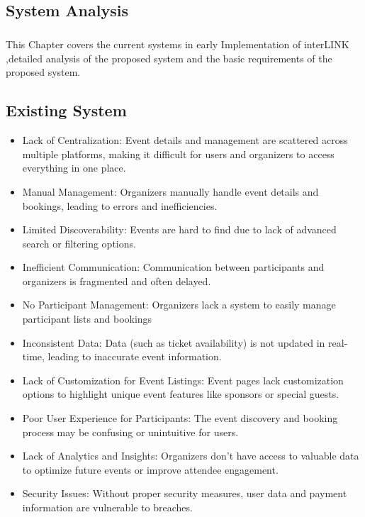 \documentclass[twoside,a4paper,openright]{report} %
\begin{document}
\begin{flushleft}
	\chapter{System Analysis}
\end{flushleft}

\paragraph{}
\hspace{1.5cm}
This Chapter covers the current systems in early Implementation of interLINK ,detailed analysis of the proposed system and the basic requirements of the proposed system.

\section{Existing System}



\begin{itemize}
	\item Lack of Centralization: Event details and management are scattered across multiple platforms, making it difficult for users and organizers to access everything in one place.
	\item Manual Management: Organizers manually handle event details and bookings, leading to errors and inefficiencies.
	\item Limited Discoverability: Events are hard to find due to lack of advanced search or filtering options.
	\item Inefficient Communication: Communication between participants and organizers is fragmented and often delayed.
	\item No Participant Management: Organizers lack a system to easily manage participant lists and bookings
	\item Inconsistent Data: Data (such as ticket availability) is not updated in real-time, leading to inaccurate event information.
	\item Lack of Customization for Event Listings: Event pages lack customization options to highlight unique event features like sponsors or special guests.
	\item Poor User Experience for Participants: The event discovery and booking process may be confusing or unintuitive for users.
	\item Lack of Analytics and Insights: Organizers don’t have access to valuable data to optimize future events or improve attendee engagement.
	\item Security Issues: Without proper security measures, user data and payment information are vulnerable to breaches.
\end{itemize}
\end{document}
